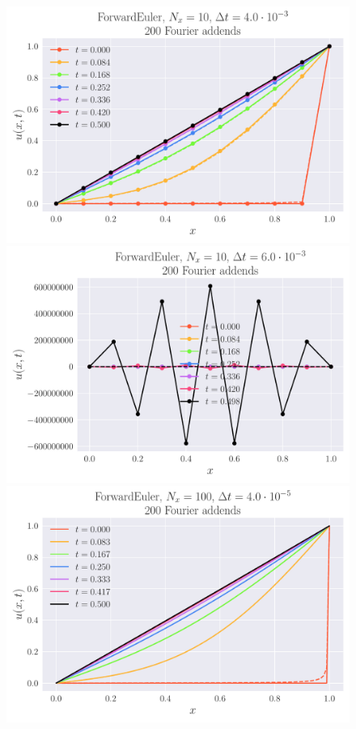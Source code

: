 \documentclass[reprint, english,notitlepage,nofootinbib]{revtex4-1}  %
\begin{document}
\begin{figure}
  \includegraphics[width=\linewidth]{ForwardEuler-Nt125-dt4_0e-03-Nx10.pdf}
  \includegraphics[width=\linewidth]{ForwardEuler-Nt83-dt6_0e-03-Nx10.pdf}
  \includegraphics[width=\linewidth]{ForwardEuler-Nt12499-dt4_0e-05-Nx100.pdf}

\end{figure}
\end{document}

